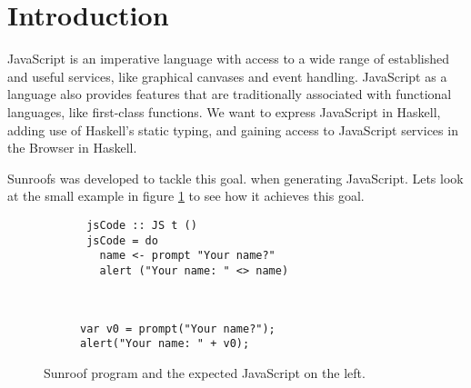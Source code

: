  
\section{Introduction}

JavaScript is an imperative language with access to a wide range
of established and useful services, like graphical canvases and event
handling. JavaScript as a language also provides features that are
traditionally associated with functional languages, like first-class 
functions. We want to express JavaScript in Haskell, adding use
of Haskell's static typing, and gaining access to JavaScript services
in the Browser in Haskell.

Sunroofs was developed to tackle this goal. 
when generating JavaScript. Lets look at the small example
in figure \ref{fig:code-example} to see how it achieves this goal.

\begin{figure}[h]
\vspace{-0.5cm}
\centering
\begin{subfigure}{0.45\textwidth}%
\begin{verbatim}
 jsCode :: JS t ()
 jsCode = do
   name <- prompt "Your name?"
   alert ("Your name: " <> name)
\end{verbatim}%
\end{subfigure}%
\hfill%
\begin{subfigure}{0.45\textwidth}
\vspace{0.25cm}%
\begin{verbatim}
  
  
var v0 = prompt("Your name?"); 
alert("Your name: " + v0);
\end{verbatim}%
\end{subfigure}%
\caption{Sunroof program and the expected JavaScript on the left.}%
\label{fig:code-example}%
\vspace{-0.5cm}
\end{figure}

